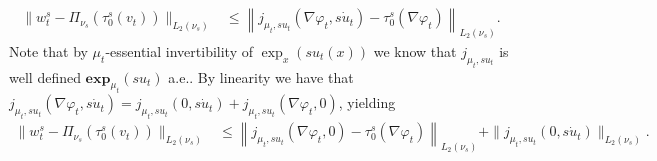 \documentclass{article}
\begin{document}
\begin{align*}
    \|w_t^s - \Pi_{\nu_s}(\tau_0^s(v_t))\|_{L_2(\nu_s)} &\leq \left\|j_{\mu_t, su_t}\left(\nabla \varphi_t, s\dot u_t\right)  - \tau_0^s(\nabla \varphi_t) \right\|_{L_2(\nu_s)}.
\end{align*}
Note that by $\mu_t$-essential invertibility of $\exp_x(su_t(x))$ we know that $j_{\mu_t, su_t}$ is well defined $\mathbf{exp}_{\mu_t}(su_t)$ a.e.. By linearity we have that $j_{\mu_t, su_t}(\nabla \varphi_t, s\dot u_t) = j_{\mu_t, su_t}(0, s\dot u_t)  + j_{\mu_t, su_t}(\nabla \varphi_t, 0)$, yielding
\begin{align*}
    \|w_t^s - \Pi_{\nu_s}(\tau_0^s(v_t))\|_{L_2(\nu_s)} &\leq \left\|j_{\mu_t, su_t}\left(\nabla \varphi_t, 0\right)  - \tau_0^s(\nabla \varphi_t) \right\|_{L_2(\nu_s)} + \|j_{\mu_t, su_t}(0, s\dot u_t) \|_{L_2(\nu_s)}.
\end{align*}

\break
\end{document}

